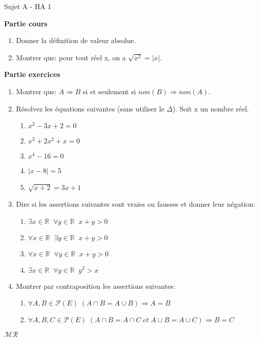 \documentclass[a4paper,12pt, landscape]{article}
\begin{document}
\begin{multicols*}{3}
\setlength{\columnsep}{1cm}
\centerline{Sujet A - HA 1}
\begin{flushleft}
  \textbf{Partie cours} 
\end{flushleft} 
\begin{enumerate}
  \item Donner la définition de valeur absolue.
  \item Montrer que: pour tout réel x, on a $\sqrt{x^2} = |x|$.
\end{enumerate}
\textbf{Partie exercices}
\begin{enumerate}
  \item Montrer que: $A \Rightarrow B$ si et seulement si  $non (B) \Rightarrow non(A)$.
  \item Résolvez les équations suivantes (sans utiliser le $\Delta$). Soit x un nombre réel.
  \begin{enumerate}
    \item $x^2 - 3x + 2 = 0$
    \item $x^3 + 2x^2 + x = 0$
    \item $x^4 - 16 = 0$
    \item $|x-8| = 5$
    \item $\sqrt{x+2} = 3x+1$
  \end{enumerate}
  \item Dire si les assertions suivantes sont vraies ou fausses et donner leur négation:
  \begin{enumerate}
    \item $\exists x \in \mathbb{R} \;\; \forall y \in \mathbb{R} \;\; x + y > 0$
    \item $\forall x \in \mathbb{R} \;\; \exists y \in \mathbb{R} \;\; x+y > 0$
    \item $\forall x \in \mathbb{R} \; \; \forall y \in \mathbb{R} \;\; x + y > 0$
    \item $\exists x \in \mathbb{R} \;\; \forall y \in \mathbb{R} \;\; y^2 > x$
  \end{enumerate}
  \item Montrer par contraposition les assertions suivantes:
  \begin{enumerate}
    \item $\forall A, B \in \mathcal{P}(E) \; (A \cap B = A \cup B) \Rightarrow A = B$
    \item $\forall A, B, C \in \mathcal{P}(E) \; (A \cap B = A \cap C \; et \; A \cup B  = A \cup C) \Rightarrow B = C$
  \end{enumerate}
\end{enumerate}
\centerline{$\mathcal{MR}$}


\end{multicols*}
\end{document}
